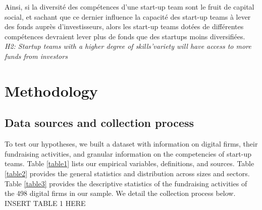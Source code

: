 \documentclass[12pt]{article}
\begin{document}
Ainsi, si la diversité des compétences d'une start-up team sont le fruit de capital social, et sachant que ce dernier influence la capacité des start-up teams à lever des fonds auprès d'investisseurs, alors les start-up teams dotées de différentes compétences devraient lever plus de fonds que des startups moins diversifiées. \\

\noindent \textit{H2: Startup teams with a higher degree of skills'variety will have access to more funds from investors} \\


\section{Methodology}

\subsection{Data sources and collection process}

To test our hypotheses, we built a dataset with information on digital firms, their fundraising activities, and granular information on the competencies of start-up teams. Table \ref{table1} lists our empirical variables, definitions, and sources. Table \ref{table2} provides the general statistics and distribution across sizes and sectors. Table \ref{table3} provides the descriptive statistics of the fundraising activities of the 498 digital firms in our sample. We detail the collection process below. \\

INSERT TABLE 1 HERE \\
\end{document}
